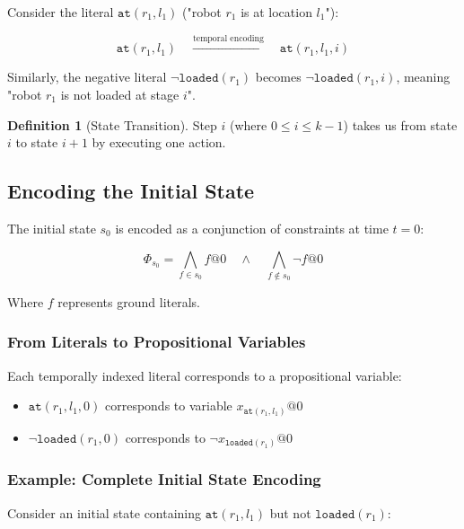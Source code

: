 \documentclass[11pt,a4paper]{article}
\theoremstyle{definition}
\newtheorem{definition}{Definition}[section]
\theoremstyle{plain}
\theoremstyle{remark}
\begin{document}
Consider the literal $\texttt{at}(r_1, l_1)$ ("robot $r_1$ is at location $l_1$"):

\[
\texttt{at}(r_1, l_1) \quad \xrightarrow{\text{temporal encoding}} \quad \texttt{at}(r_1, l_1, i)
\]

Similarly, the negative literal $\neg \texttt{loaded}(r_1)$ becomes $\neg \texttt{loaded}(r_1, i)$, meaning "robot $r_1$ is not loaded at stage $i$".

\begin{tcolorbox}[colback=cyan!5!white,colframe=cyan!75!black,title=\textbf{State Transition}]
\begin{definition}[State Transition]
Step $i$ (where $0 \leq i \leq k-1$) takes us from state $i$ to state $i+1$ by executing one action.
\end{definition}
\end{tcolorbox}

\subsection{Encoding the Initial State}

The initial state $s_0$ is encoded as a conjunction of constraints at time $t = 0$:

\[
\Phi_{s_0} = \bigwedge_{f \in s_0} f@0 \quad \land \quad \bigwedge_{f \notin s_0} \neg f@0
\]

Where $f$ represents ground literals.

\subsubsection{From Literals to Propositional Variables}

Each temporally indexed literal corresponds to a propositional variable:

\begin{itemize}
    \item $\texttt{at}(r_1, l_1, 0)$ corresponds to variable $x_{\texttt{at}(r_1, l_1)}@0$
    \item $\neg \texttt{loaded}(r_1, 0)$ corresponds to $\neg x_{\texttt{loaded}(r_1)}@0$
\end{itemize}

\subsubsection{Example: Complete Initial State Encoding}

Consider an initial state containing $\texttt{at}(r_1, l_1)$ but not $\texttt{loaded}(r_1)$:
\end{document}

